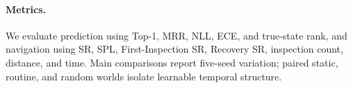 \paragraph{Metrics.}
We evaluate prediction using Top-1, MRR, NLL, ECE, and true-state rank, and navigation using SR,
SPL, First-Inspection SR, Recovery SR, inspection count, distance, and time. Main
comparisons report five-seed variation; paired static, routine, and random
worlds isolate learnable temporal structure. 
